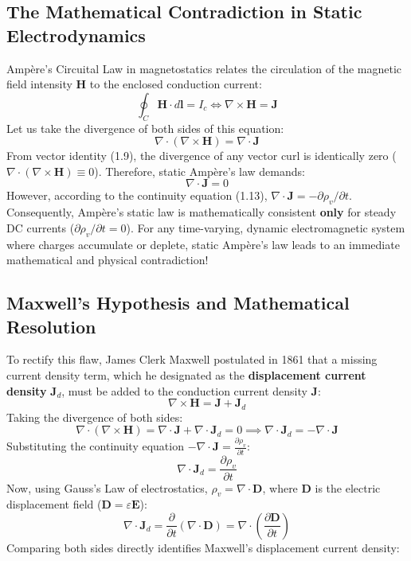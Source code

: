 \subsection{The Mathematical Contradiction in Static Electrodynamics}
Ampère's Circuital Law in magnetostatics relates the circulation of the magnetic field intensity $\mathbf{H}$ to the enclosed conduction current:
\begin{equation}
    \oint_C \mathbf{H} \cdot d\mathbf{l} = I_c \iff \nabla \times \mathbf{H} = \mathbf{J}
\end{equation}
Let us take the divergence of both sides of this equation:
\begin{equation}
    \nabla \cdot (\nabla \times \mathbf{H}) = \nabla \cdot \mathbf{J}
\end{equation}
From vector identity (1.9), the divergence of any vector curl is identically zero ($\nabla \cdot (\nabla \times \mathbf{H}) \equiv 0$). Therefore, static Ampère's law demands:
\begin{equation}
    \nabla \cdot \mathbf{J} = 0
\end{equation}
However, according to the continuity equation (1.13), $\nabla \cdot \mathbf{J} = -\partial \rho_v / \partial t$. Consequently, Ampère's static law is mathematically consistent \textbf{only} for steady DC currents ($\partial \rho_v / \partial t = 0$). For any time-varying, dynamic electromagnetic system where charges accumulate or deplete, static Ampère's law leads to an immediate mathematical and physical contradiction!

\subsection{Maxwell's Hypothesis and Mathematical Resolution}
To rectify this flaw, James Clerk Maxwell postulated in 1861 that a missing current density term, which he designated as the \textbf{displacement current density} $\mathbf{J}_d$, must be added to the conduction current density $\mathbf{J}$:
\begin{equation}
    \nabla \times \mathbf{H} = \mathbf{J} + \mathbf{J}_d
\end{equation}
Taking the divergence of both sides:
\begin{equation}
    \nabla \cdot (\nabla \times \mathbf{H}) = \nabla \cdot \mathbf{J} + \nabla \cdot \mathbf{J}_d = 0 \implies \nabla \cdot \mathbf{J}_d = -\nabla \cdot \mathbf{J}
\end{equation}
Substituting the continuity equation $-\nabla \cdot \mathbf{J} = \frac{\partial \rho_v}{\partial t}$:
\begin{equation}
    \nabla \cdot \mathbf{J}_d = \frac{\partial \rho_v}{\partial t}
\end{equation}
Now, using Gauss's Law of electrostatics, $\rho_v = \nabla \cdot \mathbf{D}$, where $\mathbf{D}$ is the electric displacement field ($\mathbf{D} = \varepsilon \mathbf{E}$):
\begin{equation}
    \nabla \cdot \mathbf{J}_d = \frac{\partial}{\partial t}(\nabla \cdot \mathbf{D}) = \nabla \cdot \left(\frac{\partial \mathbf{D}}{\partial t}\right)
\end{equation}
Comparing both sides directly identifies Maxwell's displacement current density:

